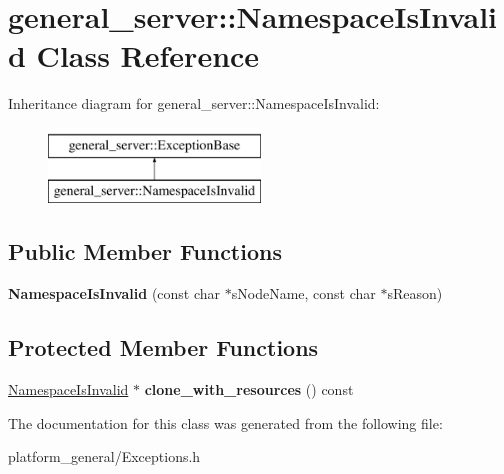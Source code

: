 \hypertarget{classgeneral__server_1_1NamespaceIsInvalid}{\section{general\-\_\-server\-:\-:\-Namespace\-Is\-Invalid \-Class \-Reference}
\label{classgeneral__server_1_1NamespaceIsInvalid}
}
\-Inheritance diagram for general\-\_\-server\-:\-:\-Namespace\-Is\-Invalid\-:\begin{figure}[H]
\begin{center}
\leavevmode
\includegraphics[height=2.000000cm]{classgeneral__server_1_1NamespaceIsInvalid}
\end{center}
\end{figure}
\subsection*{\-Public \-Member \-Functions}
\begin{DoxyCompactItemize}
\item 
\hypertarget{classgeneral__server_1_1NamespaceIsInvalid_a2483621707541f923e92256b6687b881}{{\bfseries \-Namespace\-Is\-Invalid} (const char $\ast$s\-Node\-Name, const char $\ast$s\-Reason)}\label{classgeneral__server_1_1NamespaceIsInvalid_a2483621707541f923e92256b6687b881}

\end{DoxyCompactItemize}
\subsection*{\-Protected \-Member \-Functions}
\begin{DoxyCompactItemize}
\item 
\hypertarget{classgeneral__server_1_1NamespaceIsInvalid_ae0b93ea22fa39c95cdf959c17b37754c}{\hyperlink{classgeneral__server_1_1NamespaceIsInvalid}{\-Namespace\-Is\-Invalid} $\ast$ {\bfseries clone\-\_\-with\-\_\-resources} () const }\label{classgeneral__server_1_1NamespaceIsInvalid_ae0b93ea22fa39c95cdf959c17b37754c}

\end{DoxyCompactItemize}


\-The documentation for this class was generated from the following file\-:\begin{DoxyCompactItemize}
\item 
platform\-\_\-general/\-Exceptions.\-h\end{DoxyCompactItemize}
